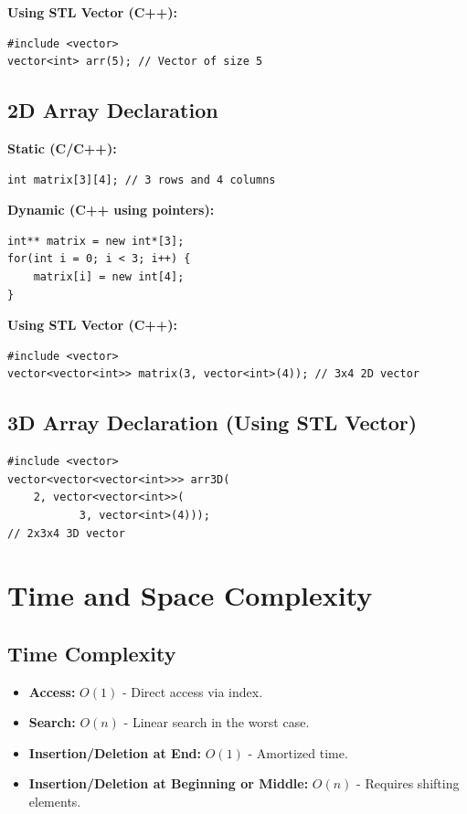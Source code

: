 \textbf{Using STL Vector (C++):}
\begin{lstlisting}[caption=1D Array using STL Vector]
#include <vector>
vector<int> arr(5); // Vector of size 5
\end{lstlisting}

\subsection*{2D Array Declaration}
\textbf{Static (C/C++):}
\begin{lstlisting}[caption=Static 2D Array Declaration]
int matrix[3][4]; // 3 rows and 4 columns
\end{lstlisting}

\textbf{Dynamic (C++ using pointers):}
\begin{lstlisting}[caption=Dynamic 2D Array Declaration using Pointers]
int** matrix = new int*[3];
for(int i = 0; i < 3; i++) {
    matrix[i] = new int[4];
}
\end{lstlisting}

\textbf{Using STL Vector (C++):}
\begin{lstlisting}[caption=2D Array using STL Vector]
#include <vector>
vector<vector<int>> matrix(3, vector<int>(4)); // 3x4 2D vector
\end{lstlisting}

\subsection*{3D Array Declaration (Using STL Vector)}
\begin{lstlisting}[caption=3D Array using STL Vector]
#include <vector>
vector<vector<vector<int>>> arr3D(
    2, vector<vector<int>>(
           3, vector<int>(4)));
// 2x3x4 3D vector
\end{lstlisting}

\section{Time and Space Complexity}
\subsection*{Time Complexity}
\begin{itemize}
  \item \textbf{Access:} \(O(1)\) - Direct access via index.
  \item \textbf{Search:} \(O(n)\) - Linear search in the worst case.
  \item \textbf{Insertion/Deletion at End:} \(O(1)\) - Amortized time.
  \item \textbf{Insertion/Deletion at Beginning or Middle:} \(O(n)\) - Requires shifting elements.
\end{itemize}

